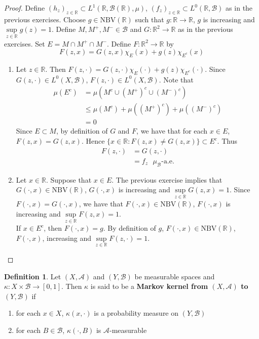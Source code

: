 \documentclass[12pt]{amsart}
\theoremstyle{definition}
\newtheorem{defn}[definition]{Definition}
\newcommand{\kap}{\kappa}
\newcommand{\R}{\mathbb{R}}
\newcommand{\MA}{\mathcal{A}}
\newcommand{\MB}{\mathcal{B}}
\newcommand{\NBV}{\text{NBV}}
\begin{document}
	\begin{proof}
		Define $(h_z)_{z \in \R} \subset L^1(\R, \MB(\R), \mu)$, $(f_z)_{z \in \R} \subset L^0(\R, \MB)$ as in the previous exercises. Choose $g \in \NBV(\R)$ such that $g: \R \rightarrow \R$, $g$ is increasing and $\sup\limits_{z \in \R} g(z) = 1$. Define $M, M^+, M^- \in \MB$ and $G: \R^2 \rightarrow \R$ as in the previous exercises. Set $E = M \cap M^+ \cap M^-$. Define $F: \R^2 \rightarrow \R$ by 
		\[
		F(z, x) = G(z, x) \chi_{E}(x) + g(z) \chi_{E^c}(x)
		\]
		\begin{enumerate}
			\item Let $z \in \R$. Then $F(z, \cdot) = G(z, \cdot) \chi_{E}(\cdot) + g(z) \chi_{E^c}(\cdot)$. Since $G(z, \cdot) \in L^0(X, \MB)$, $F(z, \cdot) \in L^0(X, \MB)$. 
			Note that
			\begin{align*}
				\mu(E^c)
				& = \mu(M^c \cup (M^+)^c \cup (M^-)^c) \\  
				& \leq \mu(M^c) + \mu((M^+)^c) + \mu((M^-)^c) \\
				& = 0
			\end{align*}
			Since $E \subset M$, by definition of $G$ and $F$, we have that for each $x \in E$, $F(z, x) = G(z, x)$. Hence $\{x \in \R: F(z, x) \neq G(z, x)\} \subset E^c$. Thus 
			\begin{align*}
				F(z, \cdot) 
				& = G(z, \cdot) \\
				& = f_z \text{ $\mu_{\MB}$-a.e.}
			\end{align*}
			\item Let $x \in \R$. Suppose that $x \in E$. The previous exercise implies that $G(\cdot, x) \in \NBV(\R)$, $G(\cdot, x)$ is increasing and $\sup\limits_{z \in \R} G(z, x) = 1$. Since $F(\cdot, x) = G(\cdot, x)$, we have that $F(\cdot, x) \in \NBV(\R)$, $F(\cdot, x)$ is increasing and $\sup\limits_{z \in \R} F(z, x) = 1$. \\
			If $x \in E^c$, then $F(\cdot, x) = g$. By definition of $g$, $F(\cdot, x) \in \NBV(\R)$, $F(\cdot, x)$, increasing and $\sup\limits_{z \in \R} F(z, \cdot) = 1$.
		\end{enumerate}
	\end{proof}
	
	\begin{defn}
		Let $(X, \MA)$ and $(Y, \MB)$ be  measurable spaces and $\kap: X \times \MB \rightarrow [0,1]$. Then $\kap$ is said to be a \textbf{Markov kernel from $(X, \MA)$ to $(Y, \MB)$} if 
		\begin{enumerate}
			\item for each $x \in X$, $\kap(x, \cdot)$ is a probability measure on $(Y, \MB)$
			\item for each $B \in \MB$, $\kap(\cdot, B)$ is $\MA$-measurable
		\end{enumerate}
	\end{defn}
\end{document}
